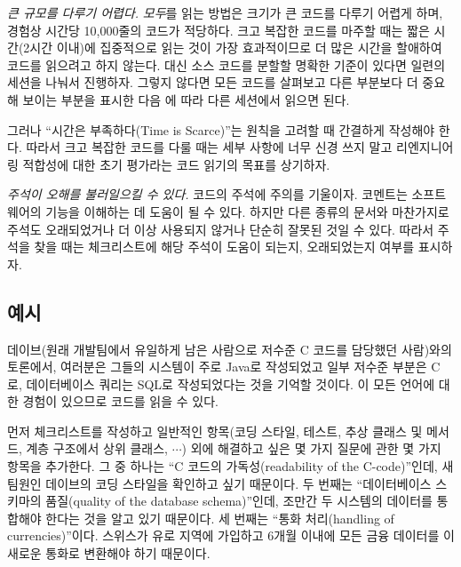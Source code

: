\documentclass[a4paper,10pt,twoside]{book}
\begin{document}
\begin{bulletlist}
  \item \emph{큰 규모를 다루기 어렵다.}
\emph{모두}를 읽는 방법은 크기가 큰 코드를 다루기 어렵게 하며, 경험상 시간당 10,000줄의 코드가 적당하다. 크고 복잡한 코드를 마주할 때는 짧은 시간(2시간 이내)에 집중적으로 읽는 것이 가장 효과적이므로 더 많은 시간을 할애하여 코드를 읽으려고 하지 않는다. 대신 소스 코드를 분할할 명확한 기준이 있다면 일련의 세션을 나눠서 진행하자. 그렇지 않다면 모든 코드를 살펴보고 다른 부분보다 더 중요해 보이는 부분을 표시한 다음 에 따라 다른 세션에서 읽으면 된다.

그러나 ``시간은 부족하다(Time is Scarce)''는 원칙을 고려할 때 간결하게 작성해야 한다. 따라서 크고 복잡한 코드를 다룰 때는 세부 사항에 너무 신경 쓰지 말고 리엔지니어링 적합성에 대한 초기 평가라는 코드 읽기의 목표를 상기하자.

  \item \emph{주석이 오해를 불러일으킬 수 있다.}
코드의 주석에 주의를 기울이자. 코멘트는 소프트웨어의 기능을 이해하는 데 도움이 될 수 있다. 하지만 다른 종류의 문서와 마찬가지로 주석도 오래되었거나 더 이상 사용되지 않거나 단순히 잘못된 것일 수 있다. 따라서 주석을 찾을 때는 체크리스트에 해당 주석이 도움이 되는지, 오래되었는지 여부를 표시하자.
\end{bulletlist}

\subsection*{예시}

데이브(원래 개발팀에서 유일하게 남은 사람으로 저수준 C 코드를 담당했던 사람)와의 토론에서, 여러분은 그들의 시스템이 주로 Java로 작성되었고 일부 저수준 부분은 C로, 데이터베이스 쿼리는 SQL로 작성되었다는 것을 기억할 것이다. 이 모든 언어에 대한 경험이 있으므로 코드를 읽을 수 있다.

먼저 체크리스트를 작성하고 일반적인 항목(코딩 스타일, 테스트, 추상 클래스 및 메서드, 계층 구조에서 상위 클래스, $\cdots$) 외에 해결하고 싶은 몇 가지 질문에 관한 몇 가지 항목을 추가한다. 그 중 하나는 ``C 코드의 가독성(readability of the C-code)''인데, 새 팀원인 데이브의 코딩 스타일을 확인하고 싶기 때문이다. 두 번째는 ``데이터베이스 스키마의 품질(quality of the database schema)''인데, 조만간 두 시스템의 데이터를 통합해야 한다는 것을 알고 있기 때문이다. 세 번째는 ``통화 처리(handling of currencies)''이다. 스위스가 유로 지역에 가입하고 6개월 이내에 모든 금융 데이터를 이 새로운 통화로 변환해야 하기 때문이다.
\end{document}
